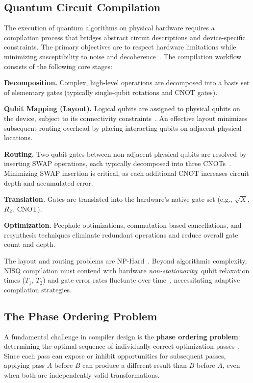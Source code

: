 \documentclass[conference]{IEEEtran}
\begin{document}
\subsection{Quantum Circuit Compilation}

The execution of quantum algorithms on physical hardware requires a compilation process that bridges abstract circuit descriptions and device-specific constraints.
The primary objectives are to respect hardware limitations while minimizing susceptibility to noise and decoherence~\cite{preskill2018quantum, cowtan2019phase}.
The compilation workflow consists of the following core stages:

\textbf{Decomposition.}
Complex, high-level operations are decomposed into a basis set of elementary gates (typically single-qubit rotations and CNOT gates).

\textbf{Qubit Mapping (Layout).}
Logical qubits are assigned to physical qubits on the device, subject to its connectivity constraints~\cite{siraichi2018qubit}.
An effective layout minimizes subsequent routing overhead by placing interacting qubits on adjacent physical locations.

\textbf{Routing.}
Two-qubit gates between non-adjacent physical qubits are resolved by inserting SWAP operations, each typically decomposed into three CNOTs~\cite{li2019tackling, cowtan2019phase}.
Minimizing SWAP insertion is critical, as each additional CNOT increases circuit depth and accumulated error.

\textbf{Translation.}
Gates are translated into the hardware's native gate set (e.g., $\sqrt{X}$, $R_Z$, CNOT).

\textbf{Optimization.}
Peephole optimizations, commutation-based cancellations, and resynthesis techniques eliminate redundant operations and reduce overall gate count and depth.

The layout and routing problems are NP-Hard~\cite{itoko2020optimization, wille2019mapping}.
Beyond algorithmic complexity, NISQ compilation must contend with hardware \textit{non-stationarity}: qubit relaxation times ($T_1$, $T_2$) and gate error rates fluctuate over time~\cite{tannu2019not}, necessitating adaptive compilation strategies.

\subsection{The Phase Ordering Problem}

A fundamental challenge in compiler design is the \textbf{phase ordering problem}: determining the optimal sequence of individually correct optimization passes~\cite{click1995combining}.
Since each pass can expose or inhibit opportunities for subsequent passes, applying pass $A$ before $B$ can produce a different result than $B$ before $A$, even when both are independently valid transformations.
\end{document}
